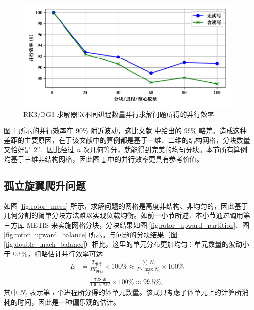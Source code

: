 \begin{figure}[h!]
\begin{centering}
\includegraphics[width=1\textwidth,height=0.3\textheight,keepaspectratio]{figures/double_mach/efficiency}
\par\end{centering}
\caption{\label{fig:double_mach_efficiency}RK3/DG3 求解器以不同进程数量并行求解问题所得的并行效率}
\end{figure}

图 \ref{fig:double_mach_efficiency} 所示的并行效率在 $90\%$ 附近波动，这比文献 \cite{Biswas_1994}
中给出的 $99\%$ 略差。造成这种差距的主要原因，在于该文献中的算例都是基于一维、二维的结构网格，分块数量又恰好是 $2^{n}$，因此经过
$n$ 次几何等分，就能得到完美的均匀分块。本节所有算例均基于三维非结构网格，因此图 \ref{fig:double_mach_efficiency}
中的并行效率更具有参考价值。

\subsection{孤立旋翼爬升问题\label{subsec:rotor-parallel}}

如图 \ref{fig:rotor_mesh} 所示，求解问题的网格是高度非结构、非均匀的，因此基于几何分割的简单分块方法难以实现负载均衡。如前一小节所述，本小节通过调用第三方库
METIS 来实施网格分块，分块结果如图 \ref{fig:rotor_upward_partition}、图
\ref{fig:rotor_upward_balance} 所示。与问题的分块结果（图
\ref{fig:double_mach_balance}）相比，这里的单元分布更加均匀：单元数量的波动小于 $0.5\%$，粗略估计并行效率可达
\begin{equation}
\begin{aligned}E & =\frac{T_{\text{串行}}}{PT_{\text{并行}}}\times100\%\approx\frac{\sum_{i}N_{i}}{P\cdot\max_{i}N_{i}}\times100\%\\
 & =\frac{72859}{100\times732}\times100\%\approx99.5\%,
\end{aligned}
\label{eq:rotor_upward_estimate}
\end{equation}
其中 $N_{i}$ 表示第 $i$ 个进程所分得的体单元数量。该式只考虑了体单元上的计算所消耗的时间，因此是一种偏乐观的估计。


